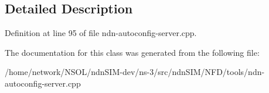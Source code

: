 \subsection{Detailed Description}


Definition at line 95 of file ndn-\/autoconfig-\/server.\+cpp.



The documentation for this class was generated from the following file\+:\begin{DoxyCompactItemize}
\item 
/home/network/\+N\+S\+O\+L/ndn\+S\+I\+M-\/dev/ns-\/3/src/ndn\+S\+I\+M/\+N\+F\+D/tools/ndn-\/autoconfig-\/server.\+cpp\end{DoxyCompactItemize}
